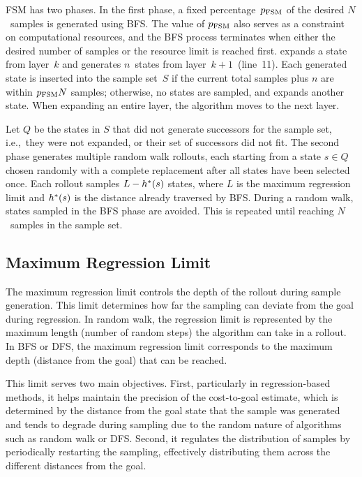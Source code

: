 FSM has two phases. In the first phase, a fixed percentage~$p_\text{FSM}$ of the desired $N$~samples is generated using BFS. The value of $p_\text{FSM}$ also serves as a constraint on computational resources, and the BFS process terminates when either the desired number of samples or the resource limit is reached first. \bfs expands a state from layer~$k$ and generates $n$~states from layer~$k+1$~(line~11). Each generated state is inserted into the sample set~$S$ if the current total samples plus $n$ are within $p_{\text{FSM}}N$ samples; otherwise, no states are sampled, and \bfs expands another state. When expanding an entire layer, the algorithm moves to the next layer.

Let $Q$ be the states in $S$ that did not generate successors for the sample set, i.e.,~they were not expanded, or their set of successors did not fit. The second phase generates multiple random walk rollouts, each starting from a state $s \in Q$ chosen randomly with a complete replacement after all states have been selected once. Each rollout samples $L-h^{*}(s)$ states, where $L$ is the maximum regression limit and $h^{*}(s)$ is the distance already traversed by BFS. During a random walk, states sampled in the BFS phase are avoided. This is repeated until reaching $N$~samples in the sample set.

\subsection{Maximum Regression Limit}
\label{sec:rollout-limit}

The maximum regression limit controls the depth of the rollout during sample generation. This limit determines how far the sampling can deviate from the goal during regression. In random walk, the regression limit is represented by the maximum length (number of random steps) the algorithm can take in a rollout. In BFS or DFS, the maximum regression limit corresponds to the maximum depth (distance from the goal) that can be reached.

This limit serves two main objectives. First, particularly in regression-based methods, it helps maintain the precision of the cost-to-goal estimate, which is determined by the distance from the goal state that the sample was generated and tends to degrade during sampling due to the random nature of algorithms such as random walk or DFS. Second, it regulates the distribution of samples by periodically restarting the sampling, effectively distributing them across the different distances from the goal.

